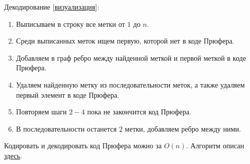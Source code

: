Декодирование
[\href{https://www.youtube.com/watch?v=7s44l7gWEVk}{визуализация}]:
\begin{enumerate}
  \item Выписываем в строку все метки от \(1\) до \(n\).
  \item Среди выписанных меток ищем первую, которой нет в коде Прюфера.
  \item Добавляем в граф ребро между найденной меткой и первой меткой в коде
  Прюфера.
  \item Удаляем найденную метку из последовательности меток, а также удаляем
  первый элемент в коде Прюфера.
  \item Повторяем шаги \(2-4\) пока не закончится код Прюфера.
  \item В последовательности останется \(2\) метки, добавляем ребро между ними.
\end{enumerate}

\begin{remark}
  Кодировать и декодировать код Прюфера можно за \(O(n)\). Алгоритм описан
  \href{https://www.scirp.org/pdf/JSEA20090200006_93737200.pdf}{здесь}.
\end{remark}
